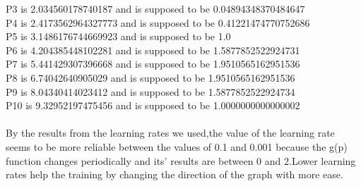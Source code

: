 \documentclass{article}
\begin{document}
P3 is 2.034560178740187 and is supposed to be 0.04894348370484647\\
P4 is 2.4173562964327773 and is supposed to be 0.41221474770752686\\
P5 is 3.1486176744669923 and is supposed to be 1.0\\
P6 is 4.204385448102281 and is supposed to be 1.5877852522924731\\
P7 is 5.441429307396668 and is supposed to be 1.9510565162951536\\
P8 is 6.74042640905029 and is supposed to be 1.9510565162951536\\
P9 is 8.04340414023412 and is supposed to be 1.5877852522924734\\
P10 is 9.32952197475456 and is supposed to be 1.0000000000000002\\~\\
By the results from the learning rates we used,the value of the learning rate seems to be more reliable between the values of 0.1 and 0.001 because the g(p) function changes periodically and its' results are between 0 and 2.Lower learning rates help the training by changing the direction of the graph with more ease.  
\end{document}

